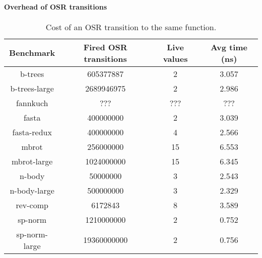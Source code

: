 \paragraph{Overhead of OSR transitions}

\begin{table} 
    \begin{tabular}{ |c|c|c|c| }
        \hline
        Benchmark & Fired OSR transitions & Live values & Avg time (ns) \\ 
        \hline
        \hline
        b-trees & 605377887 & 2 & 3.057 \\ 
        \hline
        b-trees-large & 2689946975 & 2 & 2.986 \\ 
        \hline
        fannkuch & ??? & ??? & ??? \\ 
        \hline
        fasta & 400000000 & 2 & 3.039 \\ 
        \hline
        fasta-redux & 400000000 & 4 & 2.566 \\ 
        \hline
        mbrot & 256000000 & 15 & 6.553 \\ 
        \hline
        mbrot-large & 1024000000 & 15 & 6.345 \\ 
        \hline
        n-body & 50000000 & 3 & 2.543 \\ 
        \hline
        n-body-large & 500000000 & 3 & 2.329 \\ 
        \hline
        rev-comp & 6172843 & 8 & 3.589 \\ 
        \hline
        sp-norm & 1210000000 & 2 & 0.752 \\ 
        \hline
        sp-norm-large & 19360000000 & 2 & 0.756 \\
        \hline
    \end{tabular} 
    \caption{\label{tab:sameFun} Cost of an OSR transition to the same function.} 
\end{table}
  